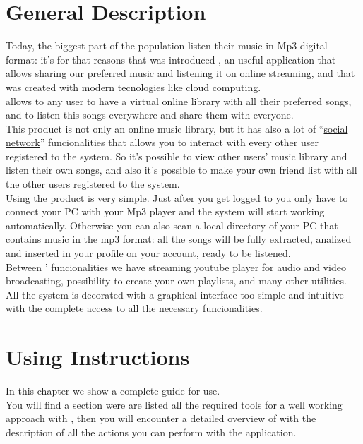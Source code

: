 \chapter{General Description}
\thispagestyle{fancy}
Today, the biggest part of the population listen their music in Mp3 digital
format: it's for that reasons that was introduced , an useful
application that allows sharing our preferred music and listening it on online
streaming, and that was created with modern tecnologies like \underline{cloud
computing}.\\

 allows to any user to have a virtual online library with all their
preferred songs, and to listen this songs everywhere and share them with
everyone.\\

This product is not only an online music library, but it has also a lot of
``\underline{social network}'' funcionalities that allows you to interact with every other user
registered to the system. So it's possible to view other users' music library
and listen their own songs, and also it's possible to make your own friend list
with all the other users registered to the system.\\

Using the product is very simple. Just after you get logged to  you
only have to connect your PC with your Mp3 player and the system will start
working automatically. Otherwise you can also scan a local directory of your PC
that contains music in the mp3 format: all the songs will be fully extracted,
analized and inserted in your profile on your  account, ready to be
listened.\\

Between ' funcionalities we have streaming youtube player for audio
and video broadcasting, possibility to create your own playlists, and many other
utilities.\\

All the system is decorated with a graphical interface  too simple and intuitive
with the complete access to all the necessary funcionalities.\\


\chapter{Using Instructions}
\thispagestyle{fancy}

In this chapter we show a complete guide for  use.\\
You will find a section were are listed all the required tools for a well
working approach with , then you will encounter a detailed overview
of  with the description of all the actions you can perform with the
application.



